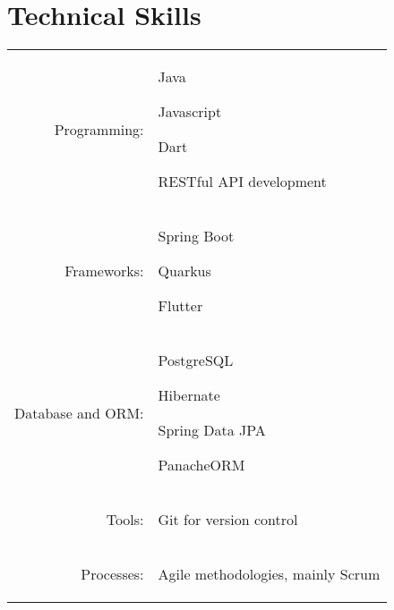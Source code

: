 \documentclass[a4paper,12pt]{article}
\begin{document}

\section{Technical Skills}
\begin{tabular}{rp{15.2cm}}
\raggedleft Programming:
& \begin{itemize*}[label=\Large\textbullet] %
    \item Java
    \item Javascript
    \item Dart
    \item RESTful API development
\end{itemize*}\\
\raggedleft Frameworks:
& \begin{itemize*}[label=\Large\textbullet]
    \item Spring Boot
    \item Quarkus
    \item Flutter
\end{itemize*}\\
\raggedleft Database and ORM:
& \begin{itemize*}[label=\Large\textbullet]
    \item PostgreSQL
    \item Hibernate
    \item Spring Data JPA
    \item PanacheORM
\end{itemize*}\\
\raggedleft Tools:
& \begin{itemize*}[label=\Large\textbullet]
    \item Git for version control
\end{itemize*}\\
\raggedleft Processes:
& \begin{itemize*}[label=\Large\textbullet]
    \item Agile methodologies, mainly Scrum

\end{itemize*}
\end{tabular}
\end{document}
